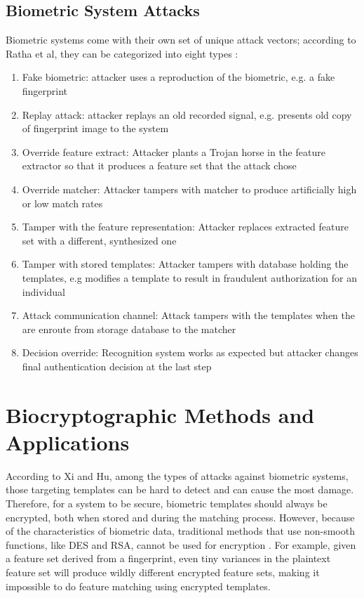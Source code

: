 \documentclass[11pt]{article}
\begin{document}
\subsection{Biometric System Attacks}
Biometric systems come with their own set of unique attack vectors; according
to Ratha et al, they can be categorized into eight types \cite{Ratha01ananalysis}:
        \begin{enumerate}[1., topsep=0pt]
    \singlespace
        \item Fake biometric: attacker uses a reproduction of the biometric, e.g. a fake fingerprint
        \item Replay attack: attacker replays an old recorded signal, e.g. presents old copy of fingerprint image to the system
        \item Override feature extract: Attacker plants a Trojan horse in 
        the feature extractor so that it produces a feature set that the 
        attack chose
        \item Override matcher: Attacker tampers with matcher to produce
        artificially high or low match rates
        \item Tamper with the feature representation: Attacker replaces
        extracted feature set with a different, synthesized one
        \item Tamper with stored templates: Attacker tampers with database
        holding the templates, e.g modifies a template to result in fraudulent 
        authorization for an individual 
        \item Attack communication channel: Attack tampers with the templates 
        when the are enroute from storage database to the matcher
        \item Decision override: Recognition system works as expected but
        attacker changes final authentication decision at the last step 
        \end{enumerate}
    \doublespace

\section{Biocryptographic Methods and Applications}
According to Xi and Hu, among the types of attacks against biometric systems,
those targeting templates can be hard to detect and can cause the most damage.
\cite{Biocryptography10} Therefore, for a system to be secure, biometric 
templates should always be encrypted, both when stored and during 
the matching process. However, because of the characteristics of biometric 
data, traditional methods that use non-smooth functions, like DES and RSA, 
cannot be used for encryption \cite{Fingerprint07}. For example, given a 
feature set derived from a fingerprint, even tiny variances in the plaintext 
feature set will produce wildly different encrypted feature sets, making 
it impossible to do feature matching using encrypted templates.
\end{document}
